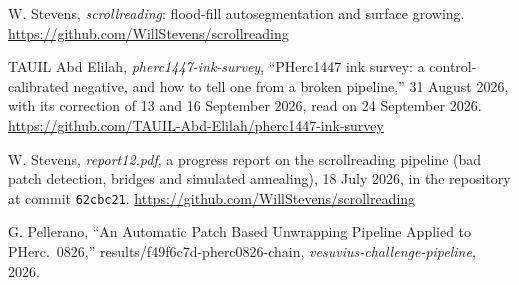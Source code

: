 
 W. Stevens, \emph{scrollreading}: flood-fill autosegmentation and surface
  growing. \url{https://github.com/WillStevens/scrollreading}

 TAUIL Abd Elilah, \emph{pherc1447-ink-survey}, ``PHerc1447 ink survey: a
  control-calibrated negative, and how to tell one from a broken pipeline,'' 31 August 2026, with its
  correction of 13 and 16 September 2026, read on 24 September 2026.
  \url{https://github.com/TAUIL-Abd-Elilah/pherc1447-ink-survey}


 W. Stevens, \emph{report12.pdf}, a progress report on the scrollreading
  pipeline (bad patch detection, bridges and simulated annealing), 18 July 2026, in the repository at
  commit \texttt{62cbc21}. \url{https://github.com/WillStevens/scrollreading}


 G. Pellerano, ``An Automatic Patch Based Unwrapping Pipeline Applied to PHerc.~0826,''
  results/f49f6c7d-pherc0826-chain, \emph{vesuvius-challenge-pipeline}, 2026.
